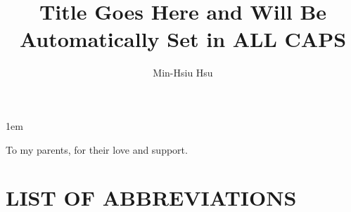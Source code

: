 \documentclass[draftthesis,tocnosub,noragright,centerchapter,12pt, mixcasechap]{uiucecethesis09}
\title{Title Goes Here and Will Be Automatically Set in ALL CAPS}
\author{Min-Hsiu Hsu}
\begin{document}
%

%
\maketitle

\parindent 1em%

\frontmatter

%
\begin{abstract}

\end{abstract}


%
\begin{dedication}
To my parents, for their love and support.
\end{dedication}

%
\begin{acknowledgments}

\end{acknowledgments}

%
\tableofcontents

%
\listoftables

%
\listoffigures

%
\chapter{LIST OF ABBREVIATIONS}
\end{document}
